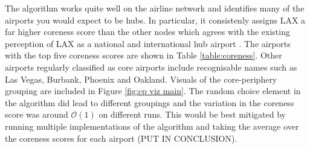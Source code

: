 \documentclass[12pt,a4paper]{article}
\begin{document}
\noindent The algorithm works quite well on the airline network and identifies many of the airports you would expect to be hubs. In particular, it consistenly assigns LAX a far higher coreness score than the other nodes which agrees with the existing perception of LAX as a national and international hub airport \cite{guimera2005worldwide}. The airports with the top five coreness scores are shown in Table \ref{table:coreness}. Other airports regularly classified as core airports include recognisable names such as Las Vegas, Burbank, Phoenix and Oakland. Visuals of the core-periphery grouping are included in Figure \ref{fig:cp viz main}. The random choice element in the algorithm did lead to different groupings and the variation in the coreness score was around $\mathcal{O}(1)$ on different runs. This would be best mitigated by running multiple implementations of the algorithm and taking the average over the coreness scores for each airport (PUT IN CONCLUSION).

\begin{center}
  \label{table:coreness}
\end{center}
\end{document}

